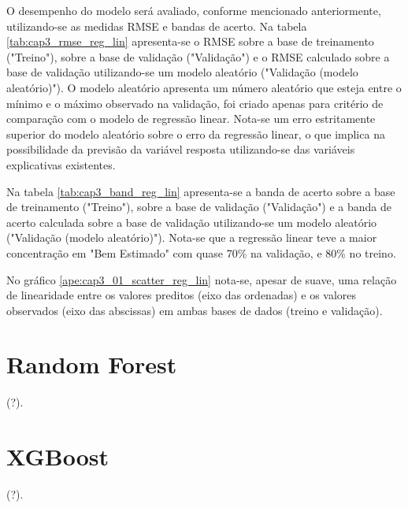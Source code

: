 O desempenho do modelo será avaliado, conforme mencionado anteriormente, utilizando-se as medidas RMSE e bandas de acerto. Na tabela \ref{tab:cap3_rmse_reg_lin} apresenta-se o RMSE sobre a base de treinamento ("Treino"), sobre a base de validação ("Validação") e o RMSE calculado sobre a base de validação utilizando-se um modelo aleatório ("Validação (modelo aleatório)"). O modelo aleatório apresenta um número aleatório que esteja entre o mínimo e o máximo observado na validação, foi criado apenas para critério de comparação com o modelo de regressão linear. Nota-se um erro estritamente superior do modelo aleatório sobre o erro da regressão linear, o que implica na possibilidade da previsão da variável resposta utilizando-se das variáveis explicativas existentes.

Na tabela \ref{tab:cap3_band_reg_lin} apresenta-se a banda de acerto sobre a base de treinamento ("Treino"), sobre a base de validação ("Validação") e a banda de acerto calculada sobre a base de validação utilizando-se um modelo aleatório ("Validação (modelo aleatório)"). Nota-se que a regressão linear teve a maior concentração em "Bem Estimado" com quase 70\% na validação, e 80\% no treino.

No gráfico \ref{ape:cap3_01_scatter_reg_lin} nota-se, apesar de suave, uma relação de linearidade entre os valores preditos (eixo das ordenadas) e os valores observados (eixo das abscissas) em ambas bases de dados (treino e validação).

\section{Random Forest}
\label{sec:random_forest}

(?).

\section{XGBoost}
\label{sec:xgboost}

(?).

